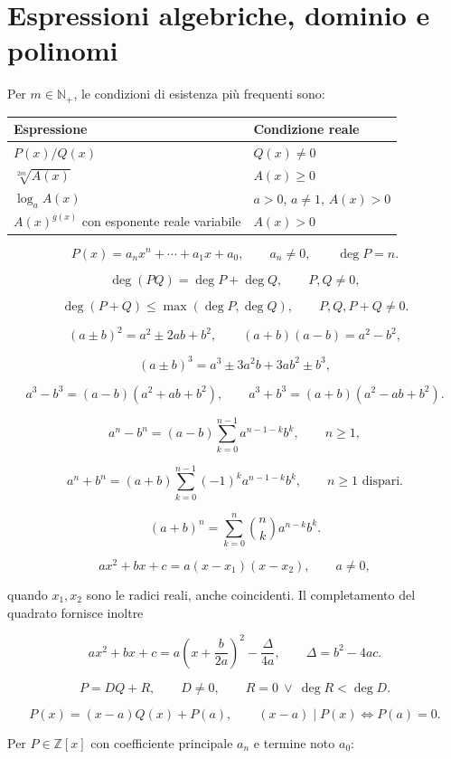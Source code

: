 \section{Espressioni algebriche, dominio e polinomi}\label{espressioni-algebriche-dominio-e-polinomi}

Per \(m\in\mathbb N_+\), le condizioni di esistenza più frequenti sono:

\begin{longtable}[]{@{}ll@{}}
\toprule\noalign{}
Espressione & Condizione reale \\
\midrule\noalign{}
\endhead
\bottomrule\noalign{}
\endlastfoot
\(P(x)/Q(x)\) & \(Q(x)\ne0\) \\
\(\sqrt[2m]{A(x)}\) & \(A(x)\ge0\) \\
\(\log_a A(x)\) & \(a>0\), \(a\ne1\), \(A(x)>0\) \\
\(A(x)^{g(x)}\) con esponente reale variabile & \(A(x)>0\) \\
\end{longtable}

\[
P(x)=a_nx^n+\cdots+a_1x+a_0,
\qquad a_n\ne0,
\qquad \deg P=n.
\]

\[
\deg(PQ)=\deg P+\deg Q,
\qquad P,Q\ne0,
\]

\[
\deg(P+Q)\le\max(\deg P,\deg Q),
\qquad P,Q,P+Q\ne0.
\]

\[
(a\pm b)^2=a^2\pm2ab+b^2,
\qquad
(a+b)(a-b)=a^2-b^2,
\]

\[
(a\pm b)^3=a^3\pm3a^2b+3ab^2\pm b^3,
\]

\[
a^3-b^3=(a-b)(a^2+ab+b^2),
\qquad
a^3+b^3=(a+b)(a^2-ab+b^2).
\]

\[
a^n-b^n=(a-b)\sum_{k=0}^{n-1}a^{n-1-k}b^k,
\qquad n\ge1,
\]

\[
a^n+b^n=(a+b)\sum_{k=0}^{n-1}(-1)^k a^{n-1-k}b^k,
\qquad n\ge1\text{ dispari}.
\]

\[
(a+b)^n=\sum_{k=0}^n\binom nk a^{n-k}b^k.
\]

\[
ax^2+bx+c=a(x-x_1)(x-x_2),
\qquad a\ne0,
\]

quando \(x_1,x_2\) sono le radici reali, anche coincidenti. Il completamento del quadrato fornisce inoltre

\[
ax^2+bx+c
=a\left(x+\frac{b}{2a}\right)^2-\frac{\Delta}{4a},
\qquad
\Delta=b^2-4ac.
\]

\[
P=DQ+R,
\qquad
D\ne0,
\qquad
R=0\ \lor\ \deg R<\deg D.
\]

\[
P(x)=(x-a)Q(x)+P(a),
\qquad
(x-a)\mid P(x)\Longleftrightarrow P(a)=0.
\]

Per \(P\in\mathbb Z[x]\) con coefficiente principale \(a_n\) e termine noto \(a_0\):

